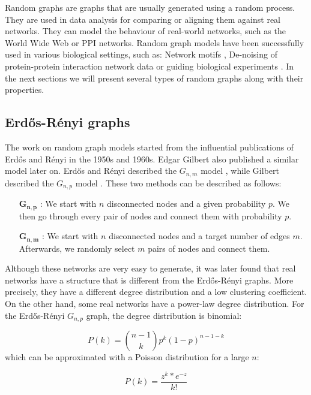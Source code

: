 Random graphs are graphs that are usually generated using a random process. They are used in data analysis for comparing or aligning them against real networks. They can model the behaviour of real-world networks, such as the World Wide Web or PPI networks. Random graph models have been successfully used in various biological settings, such as: Network motifs \cite{milo2002network}, De-noising of protein-protein interaction network data \cite{kuchaiev2009geometric} or guiding biological experiments \cite{lappe2003unraveling}. In the next sections we will present several types of random graphs along with their properties.

\subsection{Erd\H{o}s-R\'{e}nyi graphs}

The work on random graph models started from the influential publications of
Erd\H{o}s and R\'{e}nyi in the 1950s and 1960s. Edgar Gilbert also published a similar
model later on. Erd\H{o}s and R\'{e}nyi described the \(G_{n,m}\)
model \cite{erdHos1959random}, while Gilbert described the \(G_{n,p}\)
model \cite{gilbert1959random}. These two methods can be described as
follows: 
\begin{itemize}
 \item[\(\mathbf{G_{n,p}}\)]: We start with $n$ disconnected nodes and a given
probability $p$. We then go through every pair of nodes and connect them with
probability $p$.
 \item[\(\mathbf{G_{n,m}}\)]: We start with $n$ disconnected nodes and a target number of edges $m$. Afterwards, we randomly select $m$ pairs of nodes and connect them.
\end{itemize}

Although these networks are very easy to generate, it was later found
that real networks have a structure that is different from the
Erd\H{o}s-R\'{e}nyi graphs. More precisely, they have a different degree distribution and a low clustering coefficient. On the other hand, some real networks have a power-law degree distribution. For the Erd\H{o}s-R\'{e}nyi $ G_{n,p} $ graph, the degree distribution is binomial:

\begin{equation}
 P(k) = {n-1 \choose k} p^k (1-p)^{n-1-k}
\end{equation}
which can be approximated with a Poisson distribution for a large $n$:

\begin{equation}
 P(k) = \frac{z^k * e^{-z}}{k!}
\end{equation}

